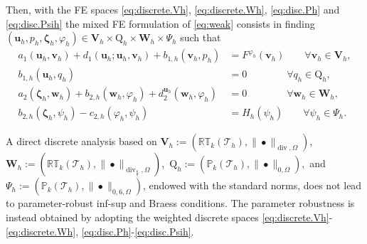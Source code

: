 \documentclass[11pt, reqno, a4paper, twoside]{article}
\newcommand{\bu}{\boldsymbol{u}}
\newcommand{\bv}{\boldsymbol{v}}
\newcommand{\bw}{\boldsymbol{w}}
\newcommand\bzeta{\boldsymbol{\zeta}}
\newcommand{\rQ}{\mathrm{Q}}
\newcommand{\bW}{\mathbf{W}}
\newcommand{\bV}{\mathbf{V}}
\newcommand{\cT}{\mathcal{T}}
\newcommand\vdiv{\mathop{\mathrm{div}}\nolimits}
\numberwithin{equation}{section}
\numberwithin{remark}{section}
\numberwithin{figure}{section}
\numberwithin{table}{section}
\begin{document}
{{Then, with the  FE spaces \eqref{eq:discrete.Vh}, \eqref{eq:discrete.Wh}, \eqref{eq:disc.Ph} and \eqref{eq:disc.Psih} 
 the mixed FE formulation of \eqref{eq:weak} consists in  finding $(\bu_h,p_h,\bzeta_h,\varphi_h)\in \bV_h\times \rQ_h\times\bW_h\times\Psi_h$ such that 
\begin{subequations}\label{eq:weak_Galerkin}
    \begin{align}
     a_1(\bu_h,\bv_h) + d_1(\bu_h; \bu_h,\bv_h) +  b_{1,h}(\bv_h,p_h) & = F^{\varphi_h}(\bv_h) \qquad \forall \bv_h \in \bV_h,\label{eq:weak,1h}\\
    b_{1,h}(\bu_h,q_h) & = 0 \qquad\qquad \forall q_h \in \rQ_h,\label{eq:weak,2h}\\
    a_2(\bzeta_h,\bw_h) + b_{2,h}(\bw_h,\varphi_h) + d_2^{\bu_h}(\bw_h, \varphi_h) & = 0\qquad \qquad \forall \bw_h \in \bW_h, \label{eq:weak,3h}\\
    b_{2,h}(\bzeta_h, \psi_h) - c_{2,h}(\varphi_h,\psi_h) & = H_h(\psi_h) \qquad \forall \psi_h \in \Psi_h. \label{eq:weak,4h}
    \end{align}
\end{subequations}

\noindent
{A direct discrete analysis based on
 \(\bV_h:=(\mathbb{RT}_k(\cT_h),\|\bullet\|_{\vdiv,\Omega}),\) \(\bW_h:=(\mathbb{RT}_k(\cT_h),\|\bullet\|_{\vdiv_{\frac65},\Omega}),\) \(\rQ_h:=(\mathbb{P}_k(\cT_h),\|\bullet\|_{0,\Omega}),\) and \(\Psi_h:=(\mathbb{P}_k(\cT_h),\|\bullet\|_{0,6,\Omega})\), 
endowed with the standard norms, does not lead to parameter-robust inf-sup and Braess conditions.
The parameter robustness is instead obtained by adopting the weighted discrete spaces \eqref{eq:discrete.Vh}-\eqref{eq:discrete.Wh}, \eqref{eq:disc.Ph}-\eqref{eq:disc.Psih}.}  

}}
\end{document}
